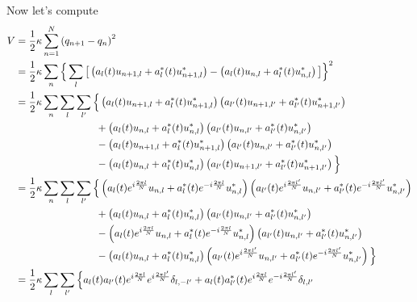 \documentclass{article}
\begin{document}
\noindent Now let's compute
\begingroup
\allowdisplaybreaks
\begin{align*}
    V &= \frac{1}{2} \kappa \sum_{n=1}^N {( q_{n+1} - q_n )}^2 \\
    &= \frac{1}{2} \kappa \sum_n {\Big\lbrace \sum_l \big[ \left( a_l (t) u_{n+1,l} + a_l^* (t) u_{n+1,l}^* \right) - \left( a_l (t) u_{n,l} + a_l^* (t) u_{n,l}^* \right) \big] \Big\rbrace}^2 \\
    &= \frac{1}{2} \kappa \sum_n \sum_l \sum_{l'} \Big\lbrace \left( a_l (t) u_{n+1,l} + a_l^* (t) u_{n+1,l}^* \right) \left( a_{l'} (t) u_{n+1,l'} + a_{l'}^* (t) u_{n+1,l'}^* \right) \\
    & \hspace{1.1in} + \left( a_l (t) u_{n,l} + a_l^* (t) u_{n,l}^* \right) \left( a_{l'} (t) u_{n,l'} + a_{l'}^* (t) u_{n,l'}^* \right) \\
    & \hspace{1.1in} - \left( a_l (t) u_{n+1,l} + a_l^* (t) u_{n+1,l}^* \right)  \left( a_{l'} (t) u_{n,l'} + a_{l'}^* (t) u_{n,l'}^* \right) \\
    & \hspace{1.1in} - \left( a_l (t) u_{n,l} + a_l^* (t) u_{n,l}^* \right) \left( a_{l'} (t) u_{n+1,l'} + a_{l'}^* (t) u_{n+1,l'}^* \right) \Big\rbrace \\
    &= \frac{1}{2} \kappa \sum_n \sum_l \sum_{l'} \Big\lbrace \left( a_l (t) e^{i \frac{2 \pi l}{N}} u_{n,l} + a_l^* (t) e^{-i \frac{2 \pi l}{N}} u_{n,l}^* \right) \left( a_{l'} (t) e^{i \frac{2 \pi l'}{N}} u_{n,l'} + a_{l'}^* (t) e^{-i \frac{2 \pi l'}{N}} u_{n,l'}^* \right) \\
    & \hspace{1.1in} + \left( a_l (t) u_{n,l} + a_l^* (t) u_{n,l}^* \right) \left( a_{l'} (t) u_{n,l'} + a_{l'}^* (t) u_{n,l'}^* \right) \\
    & \hspace{1.1in} - \left( a_l (t) e^{i \frac{2 \pi l}{N}} u_{n,l} + a_l^* (t) e^{-i \frac{2 \pi l}{N}} u_{n,l}^* \right)  \left( a_{l'} (t) u_{n,l'} + a_{l'}^* (t) u_{n,l'}^* \right) \\
    & \hspace{1.1in} - \left( a_l (t) u_{n,l} + a_l^* (t) u_{n,l}^* \right) \left( a_{l'} (t) e^{i \frac{2 \pi l'}{N}} u_{n,l'} + a_{l'}^* (t) e^{-i \frac{2 \pi l'}{N}} u_{n,l'}^* \right) \Big\rbrace \\
    &= \frac{1}{2} \kappa \sum_l \sum_{l'} \Big\lbrace a_l (t) a_{l'} (t) e^{i \frac{2 \pi l}{N}} e^{i \frac{2 \pi l'}{N}} \delta_{l,-l'} + a_l (t) a_{l'}^* (t) e^{i \frac{2 \pi l}{N}} e^{-i \frac{2 \pi l'}{N}} \delta_{l,l'} \\

\end{align*}
\end{document}
